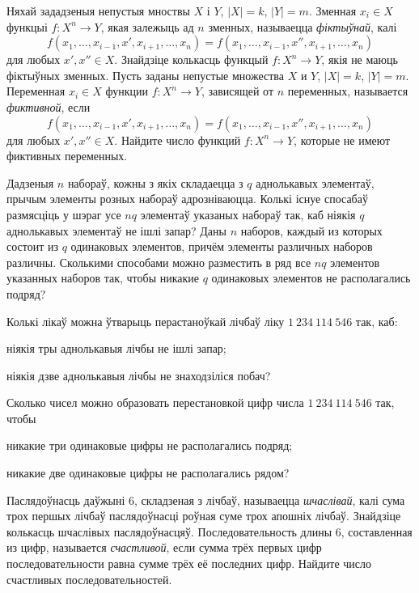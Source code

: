 \begin{problemList}
\problemItemSimple
{Няхай зададзеныя непустыя мноствы $X$ і $Y$, $|X| = k$, $|Y| = m$.
Зменная $x_i \in X$ функцыі $f\colon X^n \to Y$, якая залежыць ад $n$ зменных,
называецца \emph{фіктыўнай}, калі $$f(x_1, \ldots, x_{i - 1}, x', x_{i + 1}, \ldots, x_n) =
f(x_1, \ldots, x_{i - 1}, x'', x_{i + 1}, \ldots, x_n)$$ для любых $x', x'' \in X$.
Знайдзіце колькасць функцый $f\colon X^n \to Y$, якія не маюць фіктыўных зменных.}
{Пусть заданы непустые множества $X$ и $Y$, $|X| = k$, $|Y| = m$.
Переменная $x_i \in X$ функции $f\colon X^n \to Y$, зависящей от $n$ переменных,
называется \emph{фиктивной}, если $$f(x_1, \ldots, x_{i - 1}, x', x_{i + 1}, \ldots, x_n) =
f(x_1, \ldots, x_{i - 1}, x'', x_{i + 1}, \ldots, x_n)$$ для любых $x', x'' \in X$.
Найдите число функций $f\colon X^n \to Y$, которые не имеют фиктивных переменных.}

\bigskip

\problemItemSimple
{Дадзеныя $n$ набораў, кожны з якіх складаецца з $q$ аднолькавых элементаў, прычым
элементы розных набораў адрозніваюцца. Колькі існуе спосабаў размясціць у шэраг
усе $nq$ элементаў указаных набораў так, каб ніякія $q$ аднолькавых элементаў
не ішлі запар?}
{Даны $n$ наборов, каждый из которых состоит из $q$ одинаковых элементов, причём
элементы различных наборов различны. Сколькими способами можно разместить в ряд
все $nq$ элементов указанных наборов так, чтобы никакие $q$ одинаковых элементов
не располагались подряд?}

\newpage

\problemItemSimple
{%
Колькі лікаў можна ўтварыць перастаноўкай лічбаў ліку $1~234~114~546$ так, каб:
\begin{belarusianEnumerate}
    \item ніякія тры аднолькавыя лічбы не ішлі запар;
    \item ніякія дзве аднолькавыя лічбы не знаходзіліся побач?
\end{belarusianEnumerate}
}
{%
Сколько чисел можно образовать перестановкой цифр числа $1~234~114~546$ так, чтобы
\begin{russianEnumerate}
    \item никакие три одинаковые цифры не располагались подряд;
    \item никакие две одинаковые цифры не располагались рядом?
\end{russianEnumerate}
}

\bigskip

\problemItemSimple
{Паслядоўнасць даўжыні 6, складзеная з лічбаў, называецца \emph{шчаслівай},
калі сума трох першых лічбаў паслядоўнасці роўная суме трох апошніх лічбаў.
Знайдзіце колькасць шчаслівых паслядоўнасцяў.}
{Последовательность длины 6, составленная из цифр, называется \emph{счастливой},
если сумма трёх первых цифр последовательности равна сумме трёх её последних цифр.
Найдите число счастливых последовательностей.}


\end{problemList}

